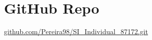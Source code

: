 \documentclass[12pt]{article}
\begin{document}


\tableofcontents 

\newpage


\newpage

\newpage
\section{GitHub Repo}
\href{https://github.com/Pereira98/SI_Individual_87172.git}{github.com/Pereira98/SI\_Individual\_87172.git}
\newpage





\end{document}
